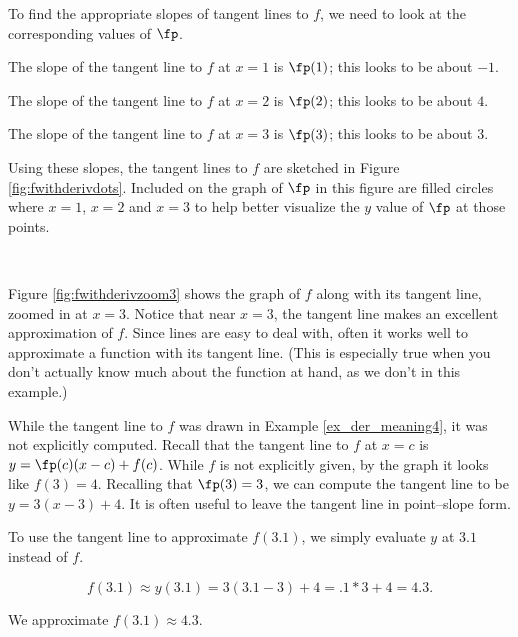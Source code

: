 {To find the appropriate slopes of tangent lines to $f$, we need to look at the corresponding values of $\fp$.

The slope of the tangent line to $f$ at $x=1$ is $\fp(1)$; this looks to be about $-1$. %

The slope of the tangent line to $f$ at $x=2$ is $\fp(2)$; this looks to be about $4$. 

The slope of the tangent line to $f$ at $x=3$ is $\fp(3)$; this looks to be about $3$. 

Using these slopes, the tangent lines to $f$ are sketched in Figure \ref{fig:fwithderivdots}. Included on the graph of $\fp$ in this figure are filled circles where $x=1$, $x=2$ and $x=3$ to help better visualize the $y$ value of $\fp$ at those points. 
}\\


{Figure \ref{fig:fwithderivzoom3} shows the graph of $f$ along with its tangent line, zoomed in at $x=3$. Notice that near $x=3$, the tangent line makes an excellent approximation of $f$. Since lines are easy to deal with, often it works well to approximate a function with its tangent line. (This is especially true when you don't actually know much about the function at hand, as we don't in this example.)


While the tangent line to $f$ was drawn in Example \ref{ex_der_meaning4}, it was not explicitly computed. Recall that the tangent line to $f$ at $x=c$ is $y = \fp(c)(x-c)+f(c)$. While $f$ is not explicitly given, by the graph it looks like $f(3) = 4$. Recalling that $\fp(3) = 3$, we can compute the tangent line to be $y = 3(x-3)+4.$ It is often useful to leave the tangent line in point--slope form.

To use the tangent line to approximate $f(3.1)$, we simply evaluate $y$ at $3.1$ instead of $f$.

$$f(3.1) \approx y(3.1) = 3(3.1-3)+4 = .1*3+4 = 4.3.$$ 

We approximate $f(3.1) \approx 4.3.$
}\\

